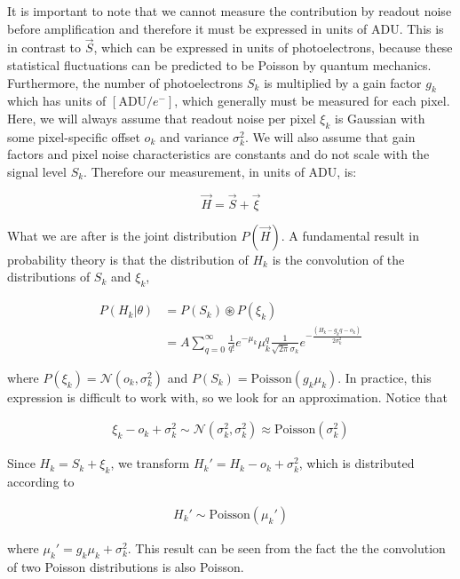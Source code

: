 \documentclass{ucetd}
\begin{document}
It is important to note that we cannot measure the contribution by readout noise before amplification and therefore it must be expressed in units of $\mathrm{ADU}$. This is in contrast to $\vec{S}$, which can be expressed in units of photoelectrons, because these statistical fluctuations can be predicted to be Poisson by quantum mechanics. Furthermore, the number of photoelectrons $S_{k}$ is  multiplied by a gain factor $g_{k}$ which has units of $[\mathrm{ADU}/e^{-}]$, which generally must be measured for each pixel. Here, we will always assume that readout noise per pixel $\xi_{k}$ is Gaussian with some pixel-specific offset $o_{k}$ and variance $\sigma_{k}^{2}$. We will also assume that gain factors and pixel noise characteristics are constants and do not scale with the signal level $S_{k}$. Therefore our measurement, in units of ADU, is: 

\begin{equation}
\vec{H} = \vec{S} + \vec{\xi}
\end{equation}

What we are after is the joint distribution $P(\vec{H})$. A fundamental result in probability theory is that the distribution of $H_{k}$ is the convolution of the distributions of $S_{k}$ and $\xi_{k}$,

\begin{align}
P(H_{k}|\theta) &= P(S_{k})\circledast P(\xi_{k})\\
&= A\sum_{q=0}^{\infty} \frac{1}{q!}e^{-\mu_{k}}\mu_{k}^{q}\frac{1}{\sqrt{2\pi}\sigma_{k}}e^{-\frac{(H_{k}-g_{k}q-o_{k})}{2\sigma_{k}^{2}}}
\end{align}

where $P(\xi_{k}) = \mathcal{N}(o_{k},\sigma_{k}^{2})$ and $P(S_{k}) = \mathrm{Poisson}(g_{k}\mu_{k})$. In practice, this expression is difficult to work with, so we look for an approximation. Notice that 

\begin{align*}
\xi_{k} - o_{k} + \sigma_{k}^{2} \sim \mathcal{N}(\sigma_{k}^{2},\sigma_{k}^{2}) \approx \mathrm{Poisson}(\sigma_{k}^{2})
\end{align*}

Since $H_{k} = S_{k} + \xi_{k}$, we transform $H_{k}' = H_{k} - o_{k} + \sigma_{k}^{2}$, which is distributed according to 

\begin{align*}
H_{k}' \sim \mathrm{Poisson}(\mu_{k}')
\end{align*}

where $\mu_{k}' = g_{k}\mu_{k} + \sigma_{k}^{2}$. This result can be seen from the fact the the convolution of two Poisson distributions is also Poisson.
\end{document}
